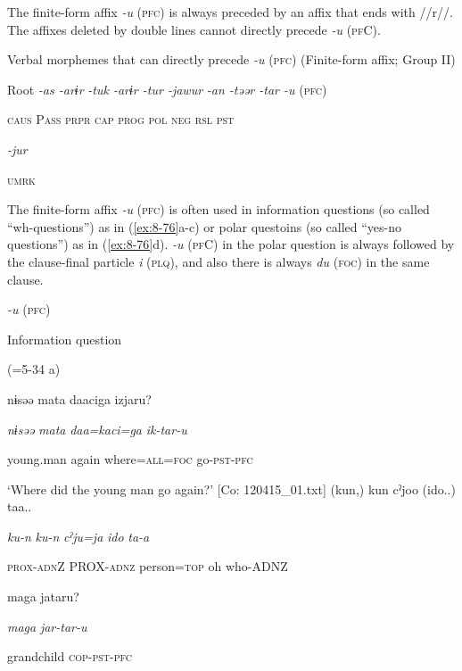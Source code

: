 The finite-form affix \textit{{}-u} (\textsc{pfc}) is always preceded by an affix that ends with //r//. The affixes deleted by double lines cannot directly precede \textit{{}-u} (\textsc{pf}C).

\ea\label{ex:8-75}
  Verbal morphemes that can directly precede \textit{{}-u} (\textsc{pfc}) (Finite-form affix; Group II)

  Root  \textit{{}-as  {}-arɨr} %
\textit{{}-tuk  {}-arɨr  {}-tur  {}-jawur} %
\textit{{}-an  {}-təər  {}-tar  {}-u} (\textsc{pfc})

    \textsc{caus}  P\textsc{ass}  \textsc{prpr}  \textsc{cap}  \textsc{prog}  \textsc{pol}  \textsc{neg}  \textsc{rsl}  \textsc{pst}

          \textit{{}-jur} 

          \textsc{umrk}

The finite-form affix \textit{{}-u} (\textsc{pfc}) is often used in information questions (so called “wh-questions”) as in (\ref{ex:8-76}a-c) or polar questoins (so called “yes-no questions”) as in (\ref{ex:8-76}d). \textit{{}-u} (\textsc{pf}C) in the polar question is always followed by the clause-final particle \textit{i} (\textsc{plq}), and also there is always \textit{du} (\textsc{foc}) in the same clause.

\ea\label{ex:8-76}
  \textit{{}-u} (\textsc{pfc})

  Information question

 (=5-34 a)

    {\TM}
\glll  nɨsəə  mata  daaciga  izjaru?

      \textit{nɨsəə}  \textit{mata}  \textit{daa=kaci=ga}  \textit{ik-tar-u}

      young.man  again  where=\textsc{all}=\textsc{foc}  go-\textsc{pst}-\textsc{pfc}

\glt ‘Where did the young man go again?’ [Co: 120415\_01.txt]
\ex {\TM}
\glll  (kun,)  kun  cˀjoo  (ido..)  taa..

      \textit{ku-n}  \textit{ku-n}  \textit{cˀju=ja}  \textit{ido}  \textit{ta-a}

      \textsc{prox}-\textsc{adn}Z  PROX-\textsc{adnz}  person=\textsc{top}  oh  who-ADNZ

      maga  jataru?      

      \textit{maga}  \textit{jar-tar-u}      

      grandchild  \textsc{cop}-\textsc{pst}-\textsc{pfc}

